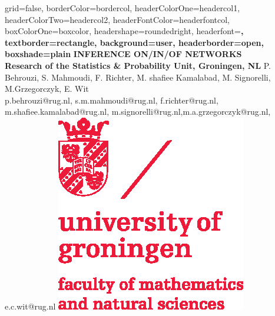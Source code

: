 \documentclass[a0paper,portrait]{baposter}
\begin{document}
\begin{poster}{
grid=false,
borderColor=bordercol, %
headerColorOne=headercol1, %
headerColorTwo=headercol2, %
headerFontColor=headerfontcol, %
boxColorOne=boxcolor, %
headershape=roundedright, %
headerfont=\Large\sf\bf, %
textborder=rectangle,
background=user,
headerborder=open, %
boxshade=plain
}
{}
%
%
{\sf\bf  INFERENCE ON/IN/OF NETWORKS \\ {\small Research of the Statistics \& Probability Unit, Groningen, NL}} %
{\vspace{1em} P. Behrouzi, S. Mahmoudi, F. Richter, M. shafiee Kamalabad, M. Signorelli, M.Grzegorczyk, E. Wit \\ %
{\footnotesize p.behrouzi@rug.nl, s.m.mahmoudi@rug.nl, f.richter@rug.nl, m.shafiee.kamalabad@rug.nl, m.signorelli@rug.nl,m.a.grzegorczyk@rug.nl, e.c.wit@rug.nl}} %
{\includegraphics[scale=0.5]{logo.eps}} %



\end{poster}
\end{document}
